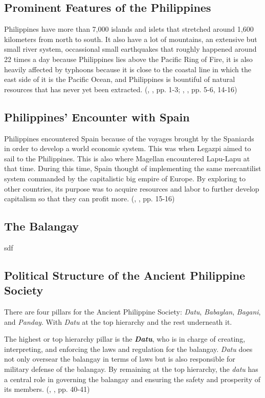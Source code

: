 \documentclass[12pt]{article}
\begin{document}
  \subsection{Prominent Features of the Philippines}
  Philippines have more than 7,000 islands and islets that stretched around 1,600 kilometers from north to south. It also have a lot of mountains, an extensive but small
  river system, occassional small earthquakes that roughly happened around 22 times a day because Philippines lies above the Pacific Ring of Fire, it is also heavily affected
  by typhoons because it is close to the coastal line in which the east side of it is the Pacific Ocean, and Philippines is bountiful of natural resources that
  has never yet been extracted. (\citeauthor{agoncillo1990filipino}, \citeyear{agoncillo1990filipino}, pp. 1-3; \citeauthor{foreman1899islands}, \citeyear{foreman1899islands}, pp. 5-6, 14-16)
   

  \subsection{Philippines' Encounter with Spain}
  Philippines encountered Spain because of the voyages brought by the Spaniards in order to develop a world economic system. This was when Legazpi aimed to sail
  to the Philippines. This is also where Magellan encountered Lapu-Lapu at that time. During this time, Spain thought of implementing the same mercantilist system
  commanded by the capitalistic big empire of Europe. By exploring to other countries, its purpose was to acquire resources and labor to further develop
  capitalism so that they can profit more. (\citeauthor{constantino1975history}, \citeyear{constantino1975history}, pp. 15-16)
  

  \subsection{The Balangay}
  sdf


  \subsection{Political Structure of the Ancient Philippine Society}
  There are four pillars for the Ancient Philippine Society: \textit{Datu}, \textit{Babaylan}, \textit{Bagani}, and \textit{Panday}. 
  With \textit{Datu} at the top hierarchy and the rest underneath it.

  The highest or top hierarchy pillar is the \textbf{\textit{Datu}}, who is in charge of creating, interpreting, and enforcing the laws and regulation for the balangay.
  \textit{Datu} does not only oversear the balangay in terms of laws but is also responsible for military defense of the balangay. By remaining at the top hierarchy, 
  the \textit{datu} has a central role in governing the balangay and ensuring the safety and prosperity of its members. (\citeauthor{agoncillo1990filipino}, \citeyear{agoncillo1990filipino}, pp. 40-41)
\end{document}
